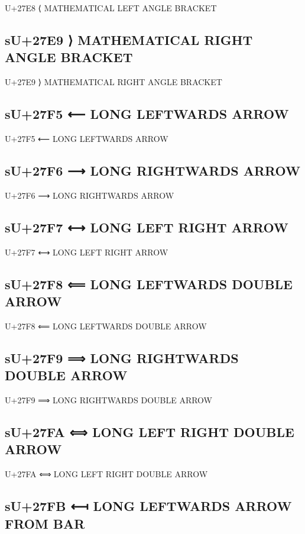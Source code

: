 U+27E8 ⟨ MATHEMATICAL LEFT ANGLE BRACKET

\subsection{sU+27E9 ⟩ MATHEMATICAL RIGHT ANGLE BRACKET}

U+27E9 ⟩ MATHEMATICAL RIGHT ANGLE BRACKET

\subsection{sU+27F5 ⟵ LONG LEFTWARDS ARROW}

U+27F5 ⟵ LONG LEFTWARDS ARROW

\subsection{sU+27F6 ⟶ LONG RIGHTWARDS ARROW}

U+27F6 ⟶ LONG RIGHTWARDS ARROW

\subsection{sU+27F7 ⟷ LONG LEFT RIGHT ARROW}

U+27F7 ⟷ LONG LEFT RIGHT ARROW

\subsection{sU+27F8 ⟸ LONG LEFTWARDS DOUBLE ARROW}

U+27F8 ⟸ LONG LEFTWARDS DOUBLE ARROW

\subsection{sU+27F9 ⟹ LONG RIGHTWARDS DOUBLE ARROW}

U+27F9 ⟹ LONG RIGHTWARDS DOUBLE ARROW

\subsection{sU+27FA ⟺ LONG LEFT RIGHT DOUBLE ARROW}

U+27FA ⟺ LONG LEFT RIGHT DOUBLE ARROW

\subsection{sU+27FB ⟻ LONG LEFTWARDS ARROW FROM BAR}

